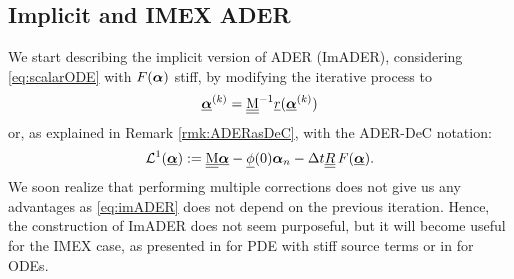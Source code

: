 \subsection{Implicit and IMEX ADER}
We start describing the implicit version of ADER (ImADER), considering \eqref{eq:scalarODE} with $F(\boldsymbol{\alpha})$ stiff, by modifying the iterative process to
\begin{equation}\label{eq:imADER}
\vec{\bc}^{(k)} = \M^{-1}\vec{r}(\vec{\bc}^{(k)}) %
\end{equation}
or, as explained in Remark \ref{rmk:ADERasDeC}, with the ADER-DeC notation:
\begin{equation}\label{eq:L1IMADER}
\mathcal{L}^1(\bbc):=\M\bbc-\vec{\phi}(0)\bc_n-\Delta t \mat{R} F(\bbc).
\end{equation}
We soon realize that performing multiple corrections does not give us any advantages as \eqref{eq:imADER} does not depend on the previous iteration.
Hence, the construction of ImADER  does not seem purposeful, but it will become useful for the IMEX case, as presented in \cite{dumbser2007FVStiff} for PDE with stiff source terms or in \cite{Han_Veiga_2021} for ODEs. %

